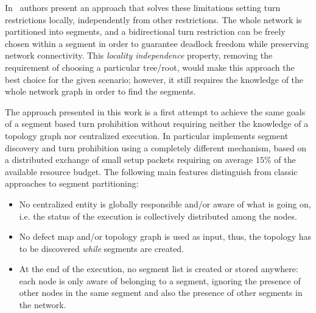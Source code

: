In~\cite{mejia_ipdps06} authors present an approach that solves these
limitations setting turn restrictions locally,
independently from other restrictions. The whole network is
partitioned into segments, and a bidirectional turn
restriction can be freely chosen within a segment in order to guarantee
deadlock freedom while preserving network connectivity. This \emph{locality
independence} property, removing the requirement of choosing a particular tree/root,
would make this approach the best choice for the given scenario;
however, it still requires the knowledge of the
whole network graph in order to find the segments.

The \disr{} approach presented in this work is a first attempt to
achieve the same goals of a segment based turn prohibition without
requiring neither the knowledge of a topology graph nor centralized execution. In particular
\disr{} implements segment discovery and turn prohibition using a
completely different mechanism, based on a distributed exchange of
small setup packets requiring on average $15\%$ of the available
resource budget. The following main features distinguish \disr{}
from classic approaches to segment partitioning: 
\begin{itemize}
\item No centralized entity is globally responsible and/or aware of
what is going on, i.e. the status of the \disr{} execution is
collectively distributed among the nodes.
\item  No defect map and/or topology graph is used as input,
thus, the topology has to be discovered \emph{while} segments are
created.
\item At the end of the execution, no segment list is created or
stored anywhere: each node is only aware of belonging to a segment,
ignoring the presence of other nodes in the same segment and also the
presence of other segments in the network.
\end{itemize}


